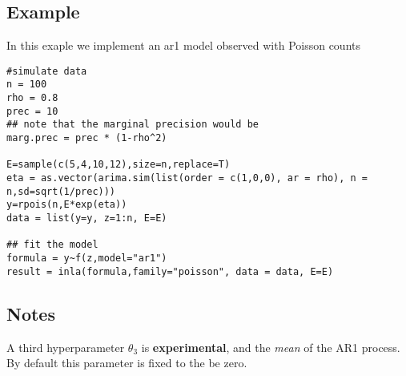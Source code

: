\documentclass[a4paper,11pt]{article}
\begin{document}
\subsection*{Example}

In this exaple we implement an ar1 model observed with Poisson counts
\begin{verbatim}
#simulate data
n = 100
rho = 0.8
prec = 10
## note that the marginal precision would be
marg.prec = prec * (1-rho^2)

E=sample(c(5,4,10,12),size=n,replace=T)
eta = as.vector(arima.sim(list(order = c(1,0,0), ar = rho), n = n,sd=sqrt(1/prec)))
y=rpois(n,E*exp(eta))
data = list(y=y, z=1:n, E=E)

## fit the model
formula = y~f(z,model="ar1")
result = inla(formula,family="poisson", data = data, E=E)
\end{verbatim}


\subsection*{Notes}

A third hyperparameter $\theta_3$ is \textbf{experimental}, and the
\emph{mean} of the AR1 process. By default this parameter is fixed to
the be zero.
\end{document}
